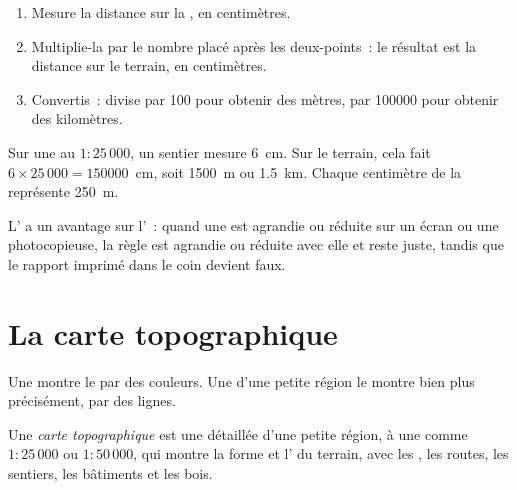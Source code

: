 \begin{method}
\begin{enumerate}
  \item Mesure la distance sur la , en centimètres.
  \item Multiplie-la par le nombre placé après les deux-points~: le
        résultat est la distance sur le terrain, en centimètres.
  \item Convertis~: divise par 100 pour obtenir des mètres, par
        \num{100000} pour obtenir des kilomètres.
\end{enumerate}
\end{method}

\begin{example}
Sur une  au $1 : 25\,000$, un sentier mesure \qty{6}{cm}. Sur le
terrain, cela fait $6 \times 25\,000 = \num{150000}$~cm, soit \qty{1500}{m}
ou \qty{1.5}{km}. Chaque centimètre de la  représente \qty{250}{m}.
\end{example}

L' a un avantage sur l'~: quand une
 est agrandie ou réduite sur un écran ou une photocopieuse, la règle
est agrandie ou réduite avec elle et reste juste, tandis que le rapport
imprimé dans le coin devient faux.

\section{La carte topographique}

Une  montre le  par des couleurs. Une  d'une
petite région le montre bien plus précisément, par des lignes.

\begin{definition}\label{def:g9:maps-of-the-earth:topographic-map}
Une \emph{carte topographique} est une  détaillée d'une
petite région, à une  comme $1 : 25\,000$ ou $1 : 50\,000$, qui
montre la forme et l' du terrain, avec les , les routes,
les sentiers, les bâtiments et les bois.
\end{definition}

